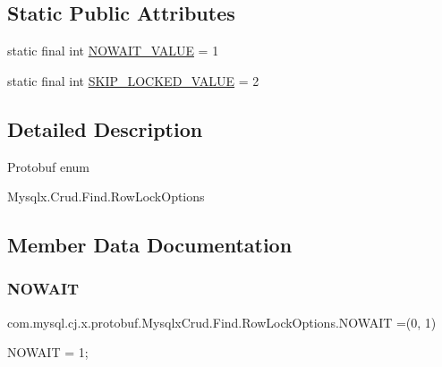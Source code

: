 \subsection*{Static Public Attributes}
\begin{DoxyCompactItemize}
\item 
static final int \mbox{\hyperlink{enumcom_1_1mysql_1_1cj_1_1x_1_1protobuf_1_1_mysqlx_crud_1_1_find_1_1_row_lock_options_a14ebc10d0029275b1275e94082e4e018}{N\+O\+W\+A\+I\+T\+\_\+\+V\+A\+L\+UE}} = 1
\item 
static final int \mbox{\hyperlink{enumcom_1_1mysql_1_1cj_1_1x_1_1protobuf_1_1_mysqlx_crud_1_1_find_1_1_row_lock_options_acdab3701d93fa0c87ffa68bf407ecd12}{S\+K\+I\+P\+\_\+\+L\+O\+C\+K\+E\+D\+\_\+\+V\+A\+L\+UE}} = 2
\end{DoxyCompactItemize}


\subsection{Detailed Description}
Protobuf enum
\begin{DoxyCode}
Mysqlx.Crud.Find.RowLockOptions 
\end{DoxyCode}
 

\subsection{Member Data Documentation}
\mbox{\label{enumcom_1_1mysql_1_1cj_1_1x_1_1protobuf_1_1_mysqlx_crud_1_1_find_1_1_row_lock_options_a46bd28c80d8a1dbe711607733bb10867}} 
\subsubsection{\texorpdfstring{N\+O\+W\+A\+IT}{NOWAIT}}
{\footnotesize\ttfamily com.\+mysql.\+cj.\+x.\+protobuf.\+Mysqlx\+Crud.\+Find.\+Row\+Lock\+Options.\+N\+O\+W\+A\+IT =(0, 1)}

{\ttfamily N\+O\+W\+A\+IT = 1;}



